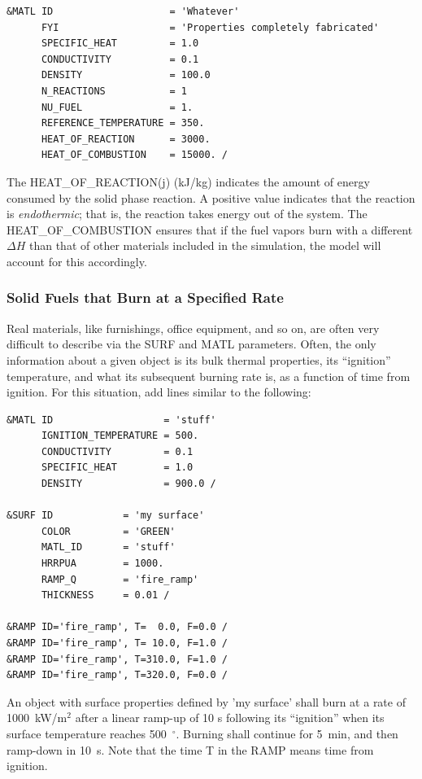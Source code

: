 \documentclass[11pt]{book}
\begin{document}
\footnotesize
\begin{verbatim}
&MATL ID                    = 'Whatever'
      FYI                   = 'Properties completely fabricated'
      SPECIFIC_HEAT         = 1.0
      CONDUCTIVITY          = 0.1
      DENSITY               = 100.0
      N_REACTIONS           = 1
      NU_FUEL               = 1.
      REFERENCE_TEMPERATURE = 350.
      HEAT_OF_REACTION      = 3000.
      HEAT_OF_COMBUSTION    = 15000. /
\end{verbatim}
\normalsize
\noindent
The {\ct HEAT\_OF\_REACTION(j)} (kJ/kg) indicates the amount of energy
consumed by the solid phase reaction. A positive value indicates that
the reaction is {\em endothermic}; that is, the reaction takes energy
out of the system. The {\ct HEAT\_OF\_COMBUSTION} ensures that if the
fuel vapors burn with a different $\Delta H$ than that of other
materials included in the simulation, the model will account for this
accordingly.

\subsubsection{Solid Fuels that Burn at a Specified Rate}

Real materials, like furnishings, office equipment, and so on, are often very difficult to describe via the
{\ct SURF} and {\ct MATL} parameters. Often, the only information about a given object is its bulk thermal properties, its ``ignition''
temperature, and what its subsequent burning rate is, as a function of time from ignition. For this
situation, add lines similar to the following:

\footnotesize
\begin{verbatim}
&MATL ID                   = 'stuff'
      IGNITION_TEMPERATURE = 500.
      CONDUCTIVITY         = 0.1
      SPECIFIC_HEAT        = 1.0
      DENSITY              = 900.0 /

&SURF ID            = 'my surface'
      COLOR         = 'GREEN'
      MATL_ID       = 'stuff'
      HRRPUA        = 1000.
      RAMP_Q        = 'fire_ramp'
      THICKNESS     = 0.01 /

&RAMP ID='fire_ramp', T=  0.0, F=0.0 /
&RAMP ID='fire_ramp', T= 10.0, F=1.0 /
&RAMP ID='fire_ramp', T=310.0, F=1.0 /
&RAMP ID='fire_ramp', T=320.0, F=0.0 /
\end{verbatim} \normalsize

\noindent
An object with surface properties defined by {\ct 'my surface'} shall burn at a rate of 1000~kW/m$^2$ after a linear ramp-up of
10 s following its ``ignition'' when its surface temperature reaches 500~$^\circ$. Burning shall continue for 5~min, and then ramp-down
in 10~s. Note that the time {\ct T} in the {\ct RAMP} means time from ignition.
\end{document}
